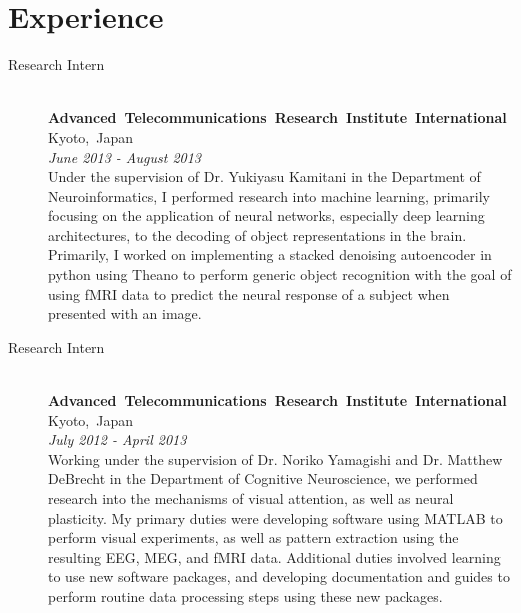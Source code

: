 \documentclass[a4paper, 10pt]{article}
\begin{document}
\section{Experience}
  \begin{description}
    \item[Research Intern]{
    \hfill \\
    \mbox{\textbf{Advanced Telecommunications Research Institute International}}
    \hfill
    \mbox{Kyoto, Japan}\\
    \emph{June 2013 - August 2013} \\
    Under the supervision of Dr. Yukiyasu Kamitani in the Department of Neuroinformatics, I performed research into machine learning, primarily focusing on the application of neural networks, especially deep learning architectures, to the decoding of object representations in the brain. Primarily, I worked on implementing a stacked denoising autoencoder in python using Theano to perform generic object recognition with the goal of using fMRI data to predict the neural response of a subject when presented with an image. 
    }
    \item[Research Intern]{
    \hfill \\
    \mbox{\textbf{Advanced Telecommunications Research Institute International}}
    \hfill
    \mbox{Kyoto, Japan}\\
    \emph{July 2012 - April 2013} \\
    Working under the supervision of Dr. Noriko Yamagishi and Dr. Matthew DeBrecht in the Department of Cognitive Neuroscience, we performed research into the mechanisms of visual attention, as well as neural plasticity. My primary duties were developing software using MATLAB to perform visual experiments, as well as pattern extraction using the resulting EEG, MEG, and fMRI data. Additional duties involved learning to use new software packages, and developing documentation and guides to perform routine data processing steps using these new packages.
    }
  \end{description}

\end{document}
